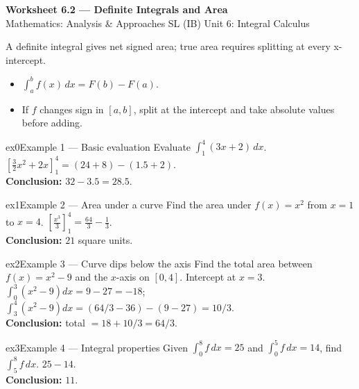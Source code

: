 \documentclass[11pt]{article}
\begin{document}
\begin{center}
{\LARGE\bfseries\color{titleblue}Worksheet 6.2 --- Definite Integrals and Area}\\[2pt]
{\small Mathematics: Analysis \& Approaches SL (IB) \textperiodcentered{} Unit 6: Integral Calculus}
\end{center}

\begin{ideabox}
A definite integral gives net signed area; true area requires splitting at every x-intercept.
\begin{itemize}[leftmargin=*,itemsep=2pt]
  \item $\displaystyle\int_a^bf(x)\,dx=F(b)-F(a)$.
  \item If $f$ changes sign in $[a,b]$, split at the intercept and take absolute values before adding.
\end{itemize}
\end{ideabox}


\begin{example}{ex0}{Example 1 --- Basic evaluation}
Evaluate $\displaystyle\int_1^4(3x+2)\,dx$.\soln
$\left[\tfrac32x^2+2x\right]_1^4=(24+8)-(1.5+2)$.\\[3pt]\textbf{Conclusion:} $32-3.5=28.5$.
\end{example}

\begin{example}{ex1}{Example 2 --- Area under a curve}
Find the area under $f(x)=x^2$ from $x=1$ to $x=4$.\soln
$\left[\tfrac{x^3}3\right]_1^4=\tfrac{64}3-\tfrac13$.\\[3pt]\textbf{Conclusion:} $21$ square units.
\end{example}

\begin{example}{ex2}{Example 3 --- Curve dips below the axis}
Find the total area between $f(x)=x^2-9$ and the $x$-axis on $[0,4]$.\soln
Intercept at $x=3$. $\int_0^3(x^2-9)dx=9-27=-18$; $\int_3^4(x^2-9)dx=(64/3-36)-(9-27)=10/3$.\\[3pt]\textbf{Conclusion:} total $=18+10/3=64/3$.
\end{example}

\begin{example}{ex3}{Example 4 --- Integral properties}
Given $\displaystyle\int_0^8f\,dx=25$ and $\int_0^5f\,dx=14$, find $\int_5^8f\,dx$.\soln
$25-14$.\\[3pt]\textbf{Conclusion:} $11$.
\end{example}
\end{document}
